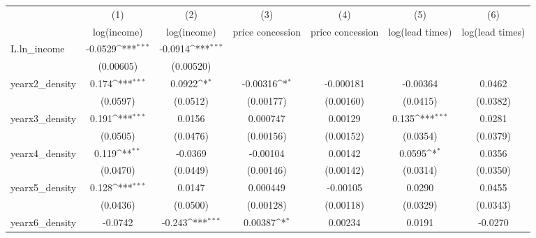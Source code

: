 {
\def\sym#1{\ifmmode^{#1}\else\(^{#1}\)\fi}
\begin{tabular}{l*{6}{c}}
\toprule
            &\multicolumn{1}{c}{(1)}&\multicolumn{1}{c}{(2)}&\multicolumn{1}{c}{(3)}&\multicolumn{1}{c}{(4)}&\multicolumn{1}{c}{(5)}&\multicolumn{1}{c}{(6)}\\
            &\multicolumn{1}{c}{log(income)}&\multicolumn{1}{c}{log(income)}&\multicolumn{1}{c}{price concession}&\multicolumn{1}{c}{price concession}&\multicolumn{1}{c}{log(lead times)}&\multicolumn{1}{c}{log(lead times)}\\
\midrule
L.ln\_income &     -0.0529\sym{***}&     -0.0914\sym{***}&                     &                     &                     &                     \\
            &   (0.00605)         &   (0.00520)         &                     &                     &                     &                     \\
\addlinespace
yearx2\_density&       0.174\sym{***}&      0.0922\sym{*}  &    -0.00316\sym{*}  &   -0.000181         &    -0.00364         &      0.0462         \\
            &    (0.0597)         &    (0.0512)         &   (0.00177)         &   (0.00160)         &    (0.0415)         &    (0.0382)         \\
\addlinespace
yearx3\_density&       0.191\sym{***}&      0.0156         &    0.000747         &     0.00129         &       0.135\sym{***}&      0.0281         \\
            &    (0.0505)         &    (0.0476)         &   (0.00156)         &   (0.00152)         &    (0.0354)         &    (0.0379)         \\
\addlinespace
yearx4\_density&       0.119\sym{**} &     -0.0369         &    -0.00104         &     0.00142         &      0.0595\sym{*}  &      0.0356         \\
            &    (0.0470)         &    (0.0449)         &   (0.00146)         &   (0.00142)         &    (0.0314)         &    (0.0350)         \\
\addlinespace
yearx5\_density&       0.128\sym{***}&      0.0147         &    0.000449         &    -0.00105         &      0.0290         &      0.0455         \\
            &    (0.0436)         &    (0.0500)         &   (0.00128)         &   (0.00118)         &    (0.0329)         &    (0.0343)         \\
\addlinespace
yearx6\_density&     -0.0742         &      -0.243\sym{***}&     0.00387\sym{*}  &     0.00234         &      0.0191         &     -0.0270         \\

\end{tabular}}
